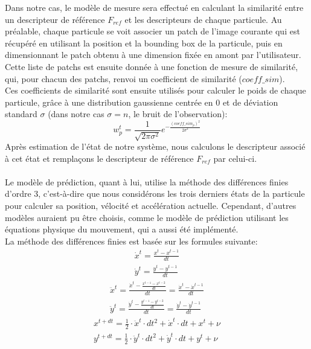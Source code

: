 Dans notre cas, le modèle de mesure sera effectué en calculant la similarité entre un descripteur de référence $F_{ref}$ et les descripteurs de chaque particule. Au préalable, chaque particule se voit associer un patch de l'image courante qui est récupéré en utilisant la position et la bounding box de la particule, puis en dimensionnant le patch obtenu à une dimension fixée en amont par l'utilisateur.\\
Cette liste de patchs est ensuite donnée à une fonction de mesure de similarité, qui, pour chacun des patchs, renvoi un coefficient de similarité ($coeff\_sim$).\\
Ces coefficients de similarité sont ensuite utilisés pour calculer le poids de chaque particule, grâce à une distribution gaussienne centrée en 0 et de déviation standard $\sigma$ (dans notre cas $\sigma=n$, le bruit de l'observation):
$$w_{p}^{t} = \frac{1}{\sqrt{2\pi\sigma^{2}}}e^{-\frac{(coeff\_sim_{p})^{2}}{2\sigma^{2}}}$$
Après estimation de l'état de notre système, nous calculons le descripteur associé à cet état et remplaçons le descripteur de référence $F_{ref}$ par celui-ci.\\
\\
Le modèle de prédiction, quant à lui, utilise la méthode des différences finies d'ordre 3, c'est-à-dire que nous considérons les trois derniers états de la particule pour calculer sa position, vélocité et accélération actuelle. Cependant, d'autres modèles auraient pu être choisis, comme le modèle de prédiction utilisant les équations physique du mouvement, qui a aussi été implémenté.\\
La méthode des différences finies est basée sur les formules suivante:
\begin{equation} \label{eq:vel}
\begin{split}
\dot{x}^{t} = \frac{x^{t} - x^{t-1}}{dt}\\
\dot{y}^{t} = \frac{y^{t} - y^{t-1}}{dt}
\end{split}
\end{equation}
\vspace{0.4cm}
\begin{equation} \label{eq:accel}
\begin{split}
\ddot{x}^{t} = \frac{\dot{x}^{t} - \frac{x^{t-1} - x^{t-2}}{dt}}{dt} = \frac{\dot{x}^{t} - \dot{x}^{t-1}}{dt}\\
\ddot{y}^{t} = \frac{\dot{y}^{t} - \frac{y^{t-1} - y^{t-2}}{dt}}{dt} = \frac{\dot{y}^{t} - \dot{y}^{t-1}}{dt}
\end{split}
\end{equation}
\vspace{0.4cm}
\begin{equation} \label{eq:pos}
\begin{split}
x^{t+dt} = \frac{1}{2} \cdot \ddot{x}^{t} \cdot dt^{2} + \dot{x}^{t} \cdot dt + x^{t} + \nu\\
y^{t+dt} = \frac{1}{2} \cdot \ddot{y}^{t} \cdot dt^{2} + \dot{y}^{t} \cdot dt + y^{t} + \nu
\end{split}
\end{equation}

